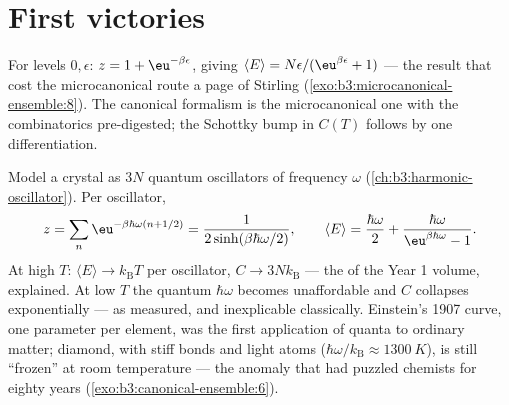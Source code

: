 \section{First victories}

\begin{example}\label{ex:b3:canonical-ensemble:twolevel}
For levels $0, \epsilon$: $z = 1 + \eu^{-\beta\epsilon}$, giving
$\langle E\rangle = N\epsilon/(\eu^{\beta\epsilon} + 1)$ --- the
result that cost the microcanonical route a page of Stirling
(\cref{exo:b3:microcanonical-ensemble:8}). The canonical formalism
is the microcanonical one with the combinatorics pre-digested; the
Schottky bump in $C(T)$ follows by one differentiation.
\end{example}

\begin{example}\label{ex:b3:canonical-ensemble:einstein}
Model a crystal as $3N$ quantum oscillators of frequency $\omega$
(\cref{ch:b3:harmonic-oscillator}). Per oscillator,
\[
z = \sum_n\eu^{-\beta\hbar\omega(n + 1/2)}
 = \frac{1}{2\sinh(\beta\hbar\omega/2)} , \qquad
\langle E\rangle = \frac{\hbar\omega}{2} +
\frac{\hbar\omega}{\eu^{\beta\hbar\omega} - 1} .
\]
At high $T$: $\langle E\rangle \to k_{\text{B}}T$ per oscillator,
$C \to 3Nk_{\text{B}}$ --- the  of the Year 1
volume, explained. At low $T$ the quantum $\hbar\omega$ becomes
unaffordable and $C$ collapses exponentially --- as measured, and
inexplicable classically. Einstein's 1907 curve, one parameter per
element, was the first application of quanta to ordinary matter;
diamond, with stiff bonds and light atoms ($\hbar\omega/k_{\text{B}}
\approx \qty{1300}{K}$), is still ``frozen'' at room temperature ---
the anomaly that had puzzled chemists for eighty years
(\cref{exo:b3:canonical-ensemble:6}).
\end{example}


